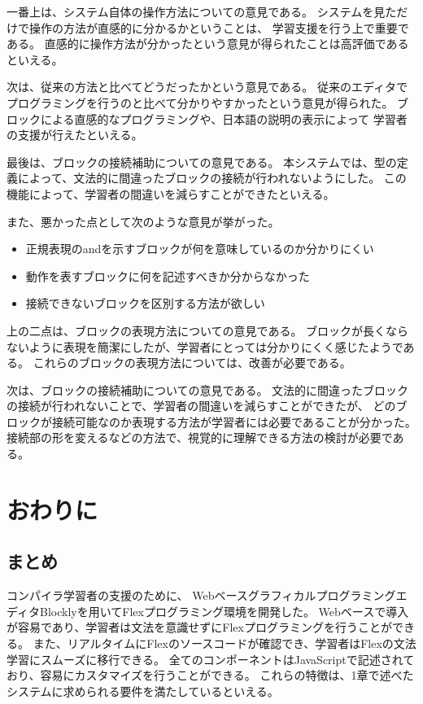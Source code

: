\documentclass{risepaper}
\begin{document}
一番上は、システム自体の操作方法についての意見である。
システムを見ただけで操作の方法が直感的に分かるかということは、
学習支援を行う上で重要である。
直感的に操作方法が分かったという意見が得られたことは高評価であるといえる。

次は、従来の方法と比べてどうだったかという意見である。
従来のエディタでプログラミングを行うのと比べて分かりやすかったという意見が得られた。
ブロックによる直感的なプログラミングや、日本語の説明の表示によって
学習者の支援が行えたといえる。

最後は、ブロックの接続補助についての意見である。
本システムでは、型の定義によって、文法的に間違ったブロックの接続が行われないようにした。
この機能によって、学習者の間違いを減らすことができたといえる。

また、悪かった点として次のような意見が挙がった。
\begin{itemize}
\item 正規表現のandを示すブロックが何を意味しているのか分かりにくい
\item 動作を表すブロックに何を記述すべきか分からなかった
\item 接続できないブロックを区別する方法が欲しい
\end{itemize}

上の二点は、ブロックの表現方法についての意見である。
ブロックが長くならないように表現を簡潔にしたが、学習者にとっては分かりにくく感じたようである。
これらのブロックの表現方法については、改善が必要である。

次は、ブロックの接続補助についての意見である。
文法的に間違ったブロックの接続が行われないことで、学習者の間違いを減らすことができたが、
どのブロックが接続可能なのか表現する方法が学習者には必要であることが分かった。
接続部の形を変えるなどの方法で、視覚的に理解できる方法の検討が必要である。


\chapter{おわりに}
\section{まとめ}

コンパイラ学習者の支援のために、
WebベースグラフィカルプログラミングエディタBlocklyを用いてFlexプログラミング環境を開発した。
Webベースで導入が容易であり、学習者は文法を意識せずにFlexプログラミングを行うことができる。
また、リアルタイムにFlexのソースコードが確認でき、学習者はFlexの文法学習にスムーズに移行できる。
全てのコンポーネントはJavaScriptで記述されており、容易にカスタマイズを行うことができる。
これらの特徴は、1章で述べたシステムに求められる要件を満たしているといえる。
\end{document}

